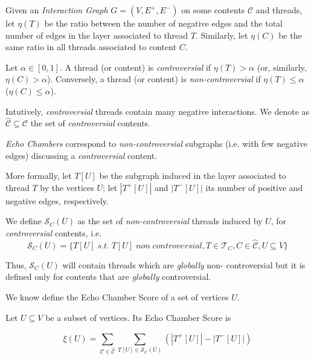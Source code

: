 \bigskip

Given an \emph{Interaction Graph} $G = (V, E^{+}, E^{-})$ on some contents
$\mathcal{C} $ and threads, let $\eta(T)$ be the ratio between the number of
negative edges and the total number of edges in the layer associated to thread
$T$. Similarly, let $\eta(C)$ be the same ratio in all threads associated to
content $C$.

\begin{definition}
	Let $\alpha \in [0,1]$. A thread (or content) is \emph{controversial} if
	$\eta(T) > \alpha$ (or, similarly, $\eta(C) > \alpha $). Conversely, a
	thread (or content) is \emph{non-controversial} if $\eta(T) \leq \alpha$
	($\eta(C) \leq \alpha$).
\end{definition}

Intutively, \emph{controversial} threads contain many negative
interactions. We denote as $\hat{\mathcal{C} } \subseteq \mathcal{C} $ the
set of \emph{controversial} contents.

\medskip

\emph{Echo Chambers} correspond to \emph{non-controversial} subgraphs
(i.e. with few negative edges) discussing a
\emph{controversial} content.

More formally, let $T[U]$ be the subgraph induced in the layer associated to
thread $T$ by the vertices $U$; let $|T^{+} [U]|$ and $|T^{-} [U]|$ its number
of positive and negative edges, respectively.

We define $\mathcal{S}_C (U)$ as the set of \emph{non-controversial} threads
induced by $U$, for \textit{controversial} contents, i.e.
	{\small
		\begin{equation}
			\mathcal{S} _{C} (U) = \{ T[U] \; s.t. \; T[U] \; non \;
			controversial, T \in \mathcal{T} _{C}, C
			\in \hat{\mathcal{C}}, U \subseteq V\}
		\end{equation}
	}

Thus, $\mathcal{S} _C (U)$ will contain threads which are \emph{globally} non-
controversial but it is defined only for contents that are \emph{globally}
controversial.

\medskip

We know define the Echo Chamber Score of a set of vertices $U$.

\begin{definition}
	Let $U \subseteq V$ be a subset of vertices. Its Echo Chamber Score is

	\begin{equation}
		\label{eq:echo-chamber-score}
		\xi(U) = \sum^{}_{\mathcal{C} \in \mathcal{\hat{C}}} \sum^{}_{T[U] \in
		\mathcal{S} _{C} (U)} (|T^{+} [U]| - |T ^{-} [U]|)
	\end{equation}
\end{definition}

